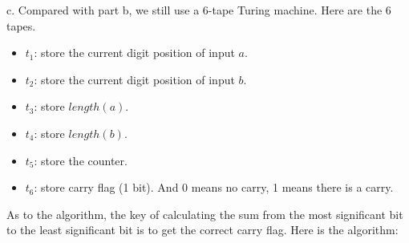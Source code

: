 \documentclass[12pt]{article}
\begin{document}
c. Compared with part b, we still use a 6-tape Turing machine. Here
are the 6 tapes.

\begin{itemize}
\item $t_1$: store the current digit position of input $a$.
\item $t_2$: store the current digit position of input $b$.
\item $t_3$: store $length(a)$.
\item $t_4$: store $length(b)$.
\item $t_5$: store the counter.
\item $t_6$: store carry flag (1 bit). And 0 means no carry, 1 means
  there is a carry.
\end{itemize}

As to the algorithm, the key of calculating the sum from the most
significant bit to the least significant bit is to get the correct
carry flag. Here is the algorithm:
\end{document}
